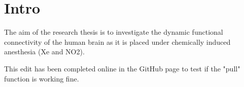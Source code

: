 \documentclass{article}
\begin{document}
\section{Intro}
The aim of the research thesis is to investigate the dynamic functional connectivity of the human brain as it is placed under chemically induced anesthesia (Xe and NO2).

This edit has been completed online in the GitHub page to test if the "pull" function is working fine.
\end{document}
